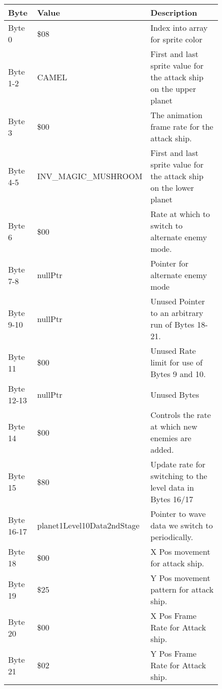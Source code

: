 \begin{figure}[H]
{\begin{adjustbox}{width=12cm}
\begin{tabular}{lll}
\toprule
 Byte       & Value                      & Description                                                         \\
\midrule
 Byte 0     & \$08                        & Index into array for sprite color                                   \\
 Byte 1-2   & CAMEL                      & First and last sprite value for the attack ship on the upper planet \\
 Byte 3     & \$00                        & The animation frame rate for the attack ship.                       \\
 Byte 4-5   & INV\_MAGIC\_MUSHROOM         & First and last sprite value for the attack ship on the lower planet \\
 Byte 6     & \$00                        & Rate at which to switch to alternate enemy mode.                    \\
 Byte 7-8   & nullPtr                    & Pointer for alternate enemy mode                                    \\
 Byte 9-10  & nullPtr                    & Unused Pointer to an arbitrary run of Bytes 18-21.                  \\
 Byte 11    & \$00                        & Unused Rate limit for use of Bytes 9 and 10.                        \\
 Byte 12-13 & nullPtr                    & Unused Bytes                                                        \\
 Byte 14    & \$00                        & Controls the rate at which new enemies are added.                   \\
 Byte 15    & \$80                        & Update rate for switching to the level data in Bytes 16/17          \\
 Byte 16-17 & planet1Level10Data2ndStage & Pointer to wave data we switch to periodically.                     \\
 Byte 18    & \$00                        & X Pos movement for attack ship.                                     \\
 Byte 19    & \$25                        & Y Pos movement pattern for attack ship.                             \\
 Byte 20    & \$00                        & X Pos Frame Rate for Attack ship.                                   \\
 Byte 21    & \$02                        & Y Pos Frame Rate for Attack ship.                                   \\

\end{tabular}
\end{adjustbox}}
\end{figure}
